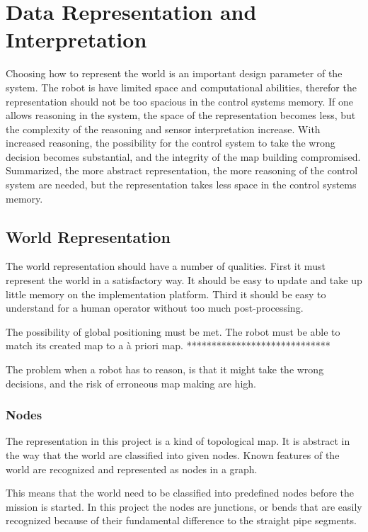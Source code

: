 

\chapter{Data Representation and Interpretation}
\label{chap5}
Choosing how to represent the world is an important design parameter of the system. The
robot is have limited space and computational abilities, therefor the representation
should not be too spacious in the control systems memory. If one allows reasoning in the
system, the space of the representation becomes less, but the complexity of the reasoning
and sensor interpretation increase. With increased reasoning, the possibility for the
control system to take the wrong decision becomes substantial, and the integrity of the
map building compromised. Summarized, the more abstract representation, the more reasoning
of the control system are needed, but the representation takes less space in the control
systems memory. 

\section{World Representation}
The world representation should have a number of qualities. First it must represent the
world in a satisfactory way. It should be easy to update and take up little memory on the
implementation platform. Third it should be easy to understand for a human operator
without too much post-processing. 

The possibility of global positioning must be met. The robot must be able to match its
created map to a \`a priori map. *****************************

The problem when a robot has to reason, is that it might
take the wrong decisions, and the risk of erroneous map making are high. 

\subsection{Nodes}
The representation in this project is a kind of topological map. It is abstract in the way
that the world are classified into given nodes. Known features of the world are recognized
and represented as nodes in a graph. 

This means that the world need to be classified into predefined nodes before the mission
is started. In this project the nodes are junctions, or bends that are easily recognized
because of their fundamental difference to the straight pipe segments. 

